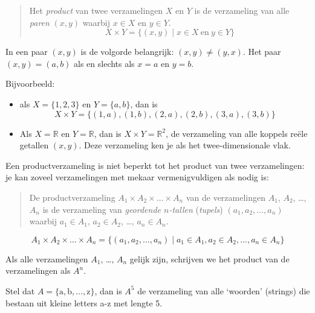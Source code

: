 \begin{quote}

Het \emph{product} van twee verzamelingen $X$ en $Y$ is de verzameling van alle \emph{paren} $(x,y)$ waarbij $x\in X$ en $y\in Y$.
\begin{equation*}
X\times Y=\{(x,y)\mid x\in X ~\mathrm{en}~y\in Y\}
\end{equation*}

\end{quote}

In een paar $(x,y)$ is de volgorde belangrijk: $(x,y)\not =(y,x)$. Het paar $(x,y)=(a,b)$ als en slechts als $x=a$ en $y=b$.

Bijvoorbeeld: 
\begin{itemize}
\item als $X=\{1,2,3\}$ en $Y=\{a,b\}$, dan is 
\begin{equation*}
X\times Y=\{(1,a),(1,b),(2,a),(2,b),(3,a),(3,b) \}
\end{equation*}
\item Als $X=\mathbb{R}$ en $Y=\mathbb{R}$, dan is 
$X \times Y=\mathbb{R}^2$, de verzameling van alle koppels 
re\"ele getallen $(x,y)$. Deze verzameling ken je als het twee-dimensionale vlak.
\end{itemize}


Een productverzameling is niet beperkt tot het product van twee verzamelingen: je kan zoveel verzamelingen met mekaar vermenigvuldigen als nodig is:
\begin{quote}
De  productverzameling $A_1\times A_2\times\dots\times A_n$ van de verzamelingen $A_1$, $A_2$, \dots, $A_n$ is de verzameling van \emph{geordende $n$-tallen} (\emph{tupels}) $(a_1,a_2,\dots,a_n)$ waarbij $a_1\in A_1$, $a_2\in  A_2$, \dots, $a_n \in A_n$.
\end{quote}
\begin{equation*}
A_1\times A_2\times\dots\times A_n=\{(a_1,a_2,\dots,a_n)\mid a_1\in A_1, a_2\in  A_2, \dots, a_n \in A_n\}
\end{equation*}

Als alle verzamelingen $A_1$, \dots, $A_n$ gelijk zijn, schrijven we het product van de verzamelingen als $A^n$.

Stel dat $A=\{\mathrm{a}, \mathrm{b},\dots,\mathrm{z}\}$, dan is $A^5$ de verzameling van alle `woorden' (strings) die bestaan uit kleine letters a-z met lengte 5. 
 
 
 
\newpage 
